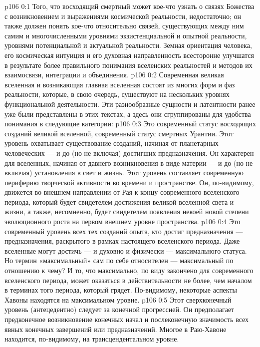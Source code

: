 \author{Мелхиседек}
\vs p106 0:1 Того, что восходящий смертный может кое\hyp{}что узнать о связях Божества с возникновением и выражениями космической реальности, недостаточно; он также должен понять кое\hyp{}что относительно связей, существующих между ним самим и многочисленными уровнями экзистенциальной и опытной реальности, уровнями потенциальной и актуальной реальности. Земная ориентация человека, его космическая интуиция и его духовная направленность всесторонне улучшатся в результате более правильного понимания вселенских реальностей и методов их взаимосвязи, интеграции и объединения.
\vs p106 0:2 Современная великая вселенная и возникающая главная вселенная состоят из многих форм и фаз реальности, которые, в свою очередь, существуют на нескольких уровнях функциональной деятельности. Эти разнообразные сущности и латентности ранее уже были представлены в этих текстах, а здесь они сгруппированы для удобства понимания в следующие категории:
\vs p106 0:3 \bibnobreakspace {} Это современный статус восходящих созданий великой вселенной, современный статус смертных Урантии. Этот уровень охватывает существование созданий, начиная от планетарных человеческих --- и до (но не включая) достигших предназначения. Он характерен для вселенных, начиная от давнего возникновения в виде материи --- и до (но не включая) установления в свет и жизнь. Этот уровень составляет современную периферию творческой активности во времени и пространстве. Он, по\hyp{}видимому, движется во внешнем направлении от Рая к концу современного вселенского периода, который будет свидетелем достижения великой вселенной света и жизни, а также, несомненно, будет свидетелем появления некоей новой степени эволюционного роста на первом внешнем уровне пространства.
\vs p106 0:4 \pc {}\bibnobreakspace {} Это современный уровень всех тех созданий опыта, кто достиг предназначения --- предназначения, раскрытого в рамках настоящего вселенского периода. Даже вселенные могут достичь --- и духовно и физически --- максимального статуса. Но термин «максимальный» сам по себе относителен --- максимальный по отношению к чему? И то, что максимально, по виду закончено для современного вселенского периода, может оказаться в действительности не более, чем началом в терминах того периода, который грядет. По\hyp{}видимому, некоторые аспекты Хавоны находятся на максимальном уровне.
\vs p106 0:5 \pc {}\bibnobreakspace {} Этот сверхконечный уровень (антецедентно) следует за конечной прогрессией. Он предполагает предконечное возникновение конечных начал и послеконечную значимость всех явных конечных завершений или предназначений. Многое в Раю\hyp{}Хавоне находится, по\hyp{}видимому, на трансцендентальном уровне.
